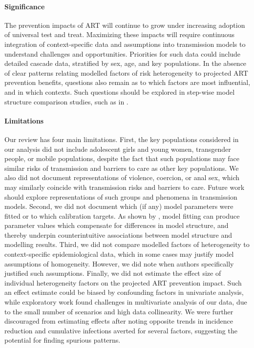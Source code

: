 \paragraph{Significance}
The prevention impacts of ART will continue to grow under
increasing adoption of universal test and treat.
Maximizing these impacts will require
continuous integration of context-specific data and assumptions
into transmission models to understand challenges and opportunities.
Priorities for such data could include detailed cascade data,
stratified by sex, age, and key populations.
In the absence of clear patterns relating
modelled factors of risk heterogeneity to projected ART prevention benefits,
questions also remain as to which factors are most influential, and in which contexts.
Such questions should be explored in step-wise model structure comparison studies,
such as in \textcite{Andrews2012,Hontelez2013,Eaton2014a}.
\paragraph{Limitations}
Our review has four main limitations.
First, the key populations considered in our analysis did not include
adolescent girls and young women, transgender people, or mobile populations,
despite the fact that such populations may face
similar risks of transmission and barriers to care as other key populations.
\cite{Tanser2015,Dellar2015} %
We also did not document representations of violence, coercion, or anal sex,
which may similarly coincide with transmission risks and barriers to care.
\cite{Silverman2011,Baggaley2013}
Future work should explore representations of
such groups and phenomena in transmission models.
Second, we did not document which (if any) model parameters were fitted
or to which calibration targets.
As shown by \textcite{Eaton2014a,Knight2020}, model fitting can produce
parameter values which compensate for differences in model structure,
and thereby underpin counterintuitive associations between model structure and modelling results.
Third, we did not compare modelled factors of heterogeneity to
context-specific epidemiological data,
which in some cases may justify model assumptions of homogeneity.
However, we did note when authors specifically justified such assumptions.
Finally, we did not estimate the effect size of
individual heterogeneity factors on the projected ART prevention impact.
Such an effect estimate could be biased by confounding factors in univariate analysis,
while exploratory work found challenges in multivariate analysis of our data,
due to the small number of scenarios and high data collinearity.
We were further discouraged from estimating effects after noting opposite trends in
incidence reduction and cumulative infections averted for several factors,
suggesting the potential for finding spurious patterns.
